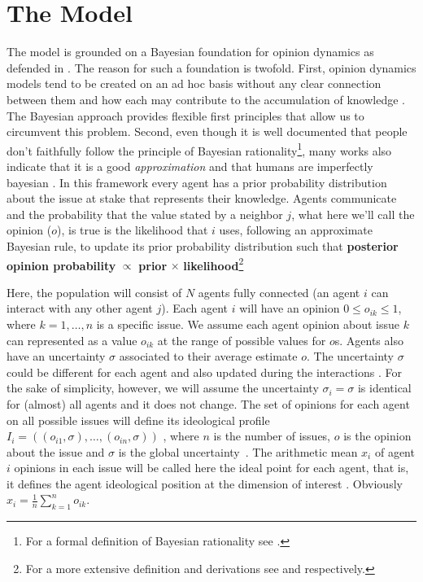 \documentclass{article}
\begin{document}
\section{The Model}
The model is grounded on a Bayesian foundation for opinion dynamics as defended
in \cite{martins12b}. The reason for such a foundation is twofold. First,
opinion dynamics models tend to be created on an ad hoc basis without any clear
connection between them and how each may contribute to the accumulation of
knowledge \cite{flache2017}. The Bayesian approach provides flexible first
principles that allow us to circumvent this problem. Second, even though it is
well documented that people don't faithfully follow the principle of Bayesian
rationality\footnote{For a formal definition of Bayesian rationality see
  \cite[p.104]{gintis2016individuality}.}, many works also indicate that it is a
good \textit{approximation} and that humans are imperfectly bayesian
\cite{tenenbaumetal07,kempetal10a, teglasetal11a, martins05b,
  gintis2016individuality, baker2017rational}. In this framework every agent has
a prior probability distribution about the issue at stake that represents their
knowledge. Agents communicate and the probability that the value stated by a
neighbor $j$, what here we'll call the opinion (\(o\)), is true is the
likelihood that $i$ uses, following an approximate Bayesian rule, to update its
prior probability distribution such that \textbf{posterior opinion probability}
$\propto$ \textbf{prior} $\times$ \textbf{likelihood}\footnote{For a more
  extensive definition and derivations see \cite{martins12b} and
  \cite{martins2009bayesian} respectively.}

Here, the population will consist of \(N\) agents fully connected (an agent $i$
can interact with any other agent $j$). Each agent $i$ will have an opinion
$0\leq o_{ik} \leq 1$, where $k=1, \ldots, n$ is a specific issue. We assume
each agent opinion about issue $k$ can represented as a value $o_{ik}$ at the
range of possible values for $o$s. Agents also have an uncertainty $\sigma$
associated to their average estimate $o$. The uncertainty $\sigma$ could be
different for each agent and also updated during the interactions
\cite{martins08c}. For the sake of simplicity, however, we will assume the
uncertainty $\sigma_i =\sigma$ is identical for (almost) all agents and it does
not change. The set of opinions for each agent on all possible issues will
define its ideological profile
\(I_i
=
(
(o_{i 1}, \sigma),
\ldots,
(o_{i n}, \sigma)
)
\)
, where \(n\) is the number of issues, \(o\) is the opinion about the issue and
\(\sigma\) is the global uncertainty~\cite{martins2009bayesian}. The arithmetic mean
$x_i$ of agent $i$ opinions in each issue will be called here the ideal point
for each agent, that is, it defines the agent ideological position at the
dimension of interest \cite{armstrong2014analyzing}. Obviously
\(
x_i
=
\frac{1}{n}
\sum_{k=1}^{n}
o_{ik}
\).
\end{document}

